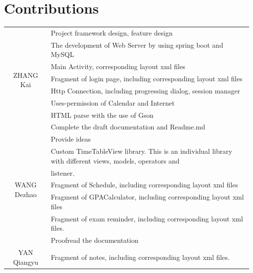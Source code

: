\documentclass{article}
\begin{document}
    
 


    
    \section{Contributions}

    \begin{table}[h]
        \centering
        \begin{tabular}{|c|l|}
            \hline
            \multirow{8}{*}{ZHANG Kai} &  Project framework design, feature design\\
            \cline{2-2}
            &The development of Web Server by using spring boot and MySQL \\
            \cline{2-2}
            &Main Activity, corresponding layout xml files \\
            \cline{2-2}
            &Fragment of login page, including corresponding layout xml files \\
            \cline{2-2}
            &Http Connection, including progressing dialog, session manager\\
            \cline{2-2}
            &Uses-permission of Calendar and Internet \\
            \cline{2-2}
            &HTML parse with the use of Gson\\
            \cline{2-2}
            &Complete the draft documentation and Readme.md\\
            \hline
            \multirow{7}{*}{WANG Dezhao} &  
            Provide ideas\\
            \cline{2-2}
            & Custom TimeTableView library. This is an individual library 
            with different views, models, operators and \\
            & listener.\\
            \cline{2-2}
            & Fragment of Schedule, including corresponding 
            layout xml files \\
            \cline{2-2}
            &Fragment of GPACalculator, including corresponding
             layout xml files \\
            \cline{2-2}
            & Fragment of exam reminder, including 
            corresponding layout xml files. \\
            \cline{2-2}
            & Proofread the documentation \\
            \hline
            \multirow{8}{*}{YAN Qiangyu} &  
            Fragment of notes, including corresponding layout xml files.\\

\end{tabular}
\end{table}
\end{document}
